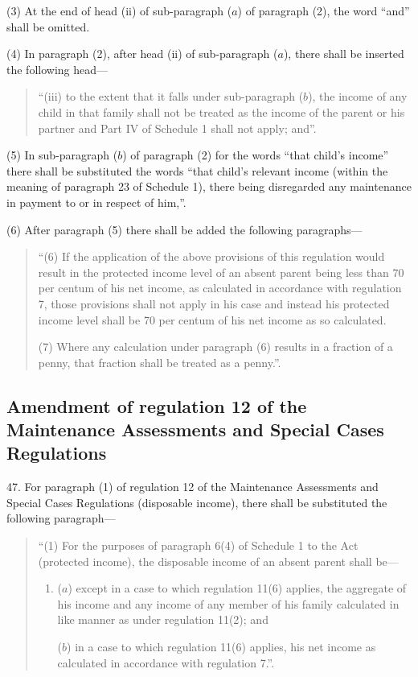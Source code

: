 \documentclass[12pt,a4paper]{article}
\begin{document}
(3) At the end of head (ii) of sub-paragraph ($a$) of paragraph (2), the word “and” shall be omitted.

(4) In paragraph (2), after head (ii) of sub-paragraph ($a$), there shall be inserted the following head—
\begin{quotation}
“(iii) to the extent that it falls under sub-paragraph ($b$), the income of any child in that family shall not be treated as the income of the parent or his partner and Part IV of Schedule 1 shall not apply; and”.
\end{quotation}

(5) In sub-paragraph ($b$) of paragraph (2) for the words “that child’s income” there shall be substituted the words “that child’s relevant income (within the meaning of paragraph 23 of Schedule 1), there being disregarded any maintenance in payment to or in respect of him,”.

(6) After paragraph (5) there shall be added the following paragraphs—
\begin{quotation}
“(6) If the application of the above provisions of this regulation would result in the protected income level of an absent parent being less than 70 per centum of his net income, as calculated in accordance with regulation 7, those provisions shall not apply in his case and instead his protected income level shall be 70 per centum of his net income as so calculated.

(7) Where any calculation under paragraph (6) results in a fraction of a penny, that fraction shall be treated as a penny.”.
\end{quotation}

\subsection[47. Amendment of regulation 12 of the Maintenance Assessments and Special Cases Regulations]{Amendment of regulation 12 of the Maintenance Assessments and Special Cases Regulations}

47.  For paragraph (1) of regulation 12 of the Maintenance Assessments and Special Cases Regulations (disposable income), there shall be substituted the following paragraph—
\begin{quotation}
“(1) For the purposes of paragraph 6(4) of Schedule 1 to the Act (protected income), the disposable income of an absent parent shall be—
\begin{enumerate}\item[]
($a$) except in a case to which regulation 11(6) applies, the aggregate of his income and any income of any member of his family calculated in like manner as under regulation 11(2); and

($b$) in a case to which regulation 11(6) applies, his net income as calculated in accordance with regulation 7.”.
\end{enumerate}
\end{quotation}
\end{document}
